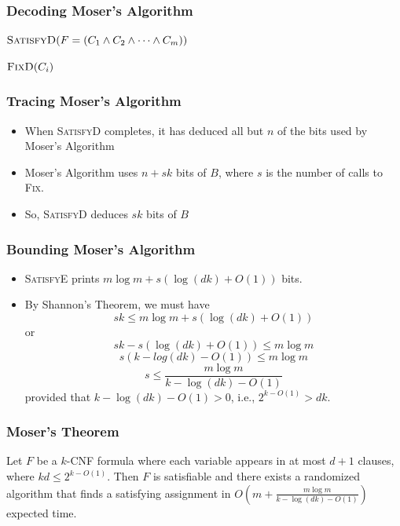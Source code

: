 \documentclass{beamer}
\begin{document}
\frame
{
  \frametitle{Decoding Moser's Algorithm}

  \noindent$\textsc{SatisfyD}(F=(C_1\wedge C_2\wedge\cdots\wedge C_m))$
  \begin{algorithmic}
   \ENDWHILE
  \end{algorithmic}
  \vspace{1ex}
  \noindent$\textsc{FixD}(C_i)$
  \begin{algorithmic}
   \ENDWHILE 
  \end{algorithmic}
}


\frame
{
  \frametitle{Tracing Moser's Algorithm}

  \begin{itemize}
    \item When \textsc{SatisfyD} completes, it has deduced all but 
          $n$ of the bits used by Moser's Algorithm
    \item Moser's Algorithm uses $n + sk$ bits of $B$, where $s$ is the
          number of calls to \textsc{Fix}.
    \item So, \textsc{SatisfyD} deduces $sk$ bits of $B$
  \end{itemize}
}

\frame
{
  \frametitle{Bounding Moser's Algorithm}

  \begin{itemize}
    \item \textsc{SatisfyE} prints $m\log m + s(\log(dk)+O(1))$ bits.
    \item By Shannon's Theorem, we must have
      \[ sk \le  m\log m + s(\log(dk)+O(1)) \]
      or
      \[ sk - s(\log(dk)+O(1)) \le m\log m \]
      \[ s(k - log(dk) - O(1)) \le m\log m \]
      \[ s \le \frac{m\log m}{k - \log(dk) - O(1)} \]
     provided that $k-\log(dk)-O(1) > 0$, i.e., $2^{k-O(1)} > dk$.
  \end{itemize}
}

\frame
{
  \frametitle{Moser's Theorem}

  \begin{thm}
    Let $F$ be a $k$-CNF formula where each variable appears in
    at most $d+1$ clauses, where $kd \le 2^{k-O(1)}$.  Then $F$
    is satisfiable and there exists a randomized algorithm that 
    finds a satisfying assignment in
    $O\left(m + \frac{m\log m}{k - \log(dk) - O(1)}\right)$ expected time.
  \end{thm}
}
\end{document}
